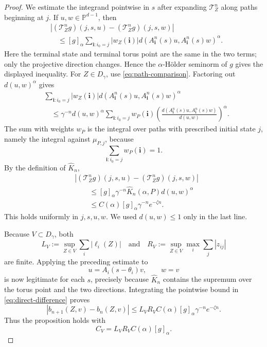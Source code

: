 \documentclass[11pt,a4paper]{amsart}
\newcommand{\PP}{\mathbb P}
\begin{document}
\begin{proof}
\smallskip
We estimate the integrand pointwise in \(s\) after expanding
\(\mathcal T_Z^n\) along paths beginning at \(j\).  If
\(u,w\in\PP^{d-1}\), then
\begin{align*}
 &
 \left|
 (\mathcal T_Z^ng)(j,s,u)
 -(\mathcal T_Z^ng)(j,s,w)
 \right|\\
 &\quad\le
 [g]_\alpha
 \sum_{\mathbf i:i_0=j}|w_Z(\mathbf i)|
 d(A_{\mathbf i}^n(s)u,A_{\mathbf i}^n(s)w)^\alpha.
\end{align*}
Here the terminal state and terminal torus point are the same in the
two terms; only the projective direction changes.  Hence the
\(\alpha\)-Hölder seminorm of \(g\) gives the displayed inequality.
For \(Z\in D_\gamma\), use
\eqref{eq:path-comparison}.  Factoring out \(d(u,w)^\alpha\) gives
\[
\begin{aligned}
 &\sum_{\mathbf i:i_0=j}|w_Z(\mathbf i)|
 d(A_{\mathbf i}^n(s)u,A_{\mathbf i}^n(s)w)^\alpha\\
 &\quad\le
 \gamma^{-n}d(u,w)^\alpha
 \sum_{\mathbf i:i_0=j}w_P(\mathbf i)
 \left(
 \frac{d(A_{\mathbf i}^n(s)u,A_{\mathbf i}^n(s)w)}
      {d(u,w)}
 \right)^\alpha.
\end{aligned}
\]
The sum with weights \(w_P\) is the integral over paths with prescribed
initial state \(j\), namely the integral against \(\mu_{P,j}\), because
\[
 \sum_{\mathbf i:i_0=j}w_P(\mathbf i)=1.
\]
By the definition of \(\widehat K_n\),
\[
\begin{aligned}
 &
 \left|
 (\mathcal T_Z^ng)(j,s,u)
 -(\mathcal T_Z^ng)(j,s,w)
 \right|\\
 &\qquad\le
 [g]_\alpha\gamma^{-n}
 \widehat K_n(\alpha,P)d(u,w)^\alpha\\
 &\qquad\le
 C(\alpha)[g]_\alpha
 \gamma^{-n}e^{-\zeta n}.
\end{aligned}
\]
This holds uniformly in \(j,s,u,w\).  We used \(d(u,w)\le1\) only in
the last line.

\smallskip
Because \(V\subset D_\gamma\), both
\[
 L_V:=\sup_{Z\in V}\sum_i|\ell_i(Z)|
\quad\text{and}\quad
 R_V:=\sup_{Z\in V}\max_i\sum_j|z_{ij}|
\]
are finite.  Applying the preceding estimate to
\[
 u=A_i(s-\theta_i)v,\qquad w=v
\]
is now legitimate for each \(s\), precisely because
\(\widehat K_n\) contains the supremum over the torus point and the
two directions.  Integrating the pointwise bound in
\eqref{eq:direct-difference} proves
\[
 |b_{n+1}(Z,v)-b_n(Z,v)|
 \le
 L_VR_VC(\alpha)[g]_\alpha
 \gamma^{-n}e^{-\zeta n}.
\]
Thus the proposition holds with
\[
 C_V=L_VR_VC(\alpha)[g]_\alpha.
\]
\end{proof}
\end{document}
